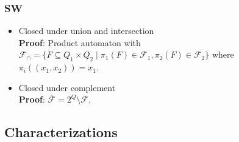 \documentclass{article}
\begin{document}
\subsubsection{SW}
\begin{itemize}
	\item Closed under union and intersection \\
    	\textbf{Proof}: Product automaton with $\mathcal{F}_\cap = \{ F \subseteq Q_1 \times Q_2 \mid \pi_1(F) \in \mathcal{F}_1, \pi_2(F) \in \mathcal{F}_2 \}$ where $\pi_i((x_1, x_2)) = x_1$. 
    \item Closed under complement \\
    	\textbf{Proof}: $\overline{\mathcal{F}} = 2^Q \setminus \mathcal{F}$.
\end{itemize}

\subsection{Characterizations}
\end{document}
